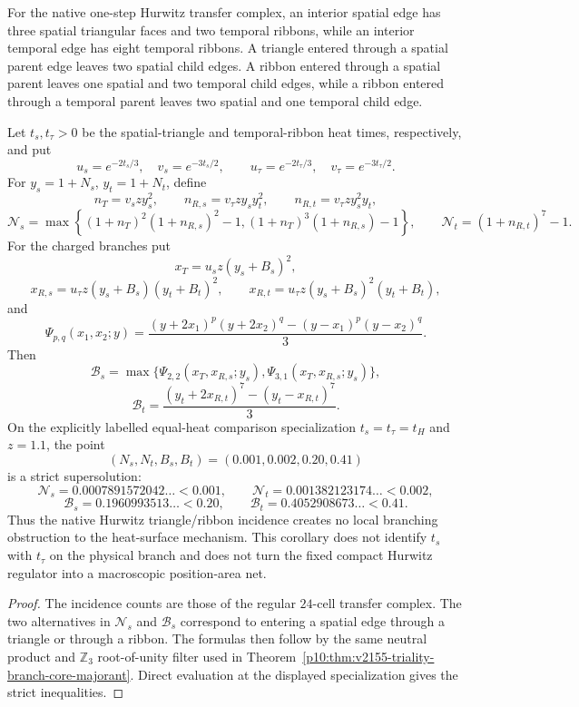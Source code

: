 \documentclass[12pt,a4paper]{article}
\begin{document}
\begin{corollary}
\label{p10:cor:v2158-hurwitz-two-type-triality}
For the native one-step Hurwitz transfer complex, an interior spatial edge has
three spatial triangular faces and two temporal ribbons, while an interior
temporal edge has eight temporal ribbons.  A triangle entered through a
spatial parent edge leaves two spatial child edges.  A ribbon entered through
a spatial parent leaves one spatial and two temporal child edges, while a
ribbon entered through a temporal parent leaves two spatial and one temporal
child edge.

Let $t_s,t_\tau>0$ be the spatial-triangle and temporal-ribbon heat times,
respectively, and put
\[
 u_s=e^{-2t_s/3},\quad v_s=e^{-3t_s/2},\qquad
 u_\tau=e^{-2t_\tau/3},\quad v_\tau=e^{-3t_\tau/2}.
\]
For $y_s=1+N_s$, $y_t=1+N_t$, define
\[
 n_T=v_szy_s^2,\qquad
 n_{R,s}=v_\tau z y_s y_t^2,\qquad
 n_{R,t}=v_\tau z y_s^2y_t,
\]
\[
 \mathcal N_s=
 \max\!\left\{
 (1+n_T)^2(1+n_{R,s})^2-1,
 (1+n_T)^3(1+n_{R,s})-1
 \right\},
 \qquad
 \mathcal N_t=(1+n_{R,t})^7-1.
\]
For the charged branches put
\[
 x_T=u_s z(y_s+B_s)^2,
\]
\[
 x_{R,s}=u_\tau z(y_s+B_s)(y_t+B_t)^2,
 \qquad
 x_{R,t}=u_\tau z(y_s+B_s)^2(y_t+B_t),
\]
and
\[
 \Psi_{p,q}(x_1,x_2;y)
 =\frac{(y+2x_1)^p(y+2x_2)^q-(y-x_1)^p(y-x_2)^q}{3}.
\]
Then
\[
 \mathcal B_s=\max\{\Psi_{2,2}(x_T,x_{R,s};y_s),
                       \Psi_{3,1}(x_T,x_{R,s};y_s)\},
\]
\[
 \mathcal B_t=
 \frac{(y_t+2x_{R,t})^7-(y_t-x_{R,t})^7}{3}.
\]
On the explicitly labelled equal-heat comparison specialization
$t_s=t_\tau=t_H$ and $z=1.1$, the point
\[
 (N_s,N_t,B_s,B_t)=(0.001,0.002,0.20,0.41)
\]
is a strict supersolution:
\[
 \mathcal N_s=0.0007891572042\ldots<0.001,
 \qquad
 \mathcal N_t=0.001382123174\ldots<0.002,
\]
\[
 \mathcal B_s=0.1960993513\ldots<0.20,
 \qquad
 \mathcal B_t=0.4052908673\ldots<0.41.
\]
Thus the native Hurwitz triangle/ribbon incidence creates no local branching
obstruction to the heat-surface mechanism.  This corollary does not identify
$t_s$ with $t_\tau$ on the physical branch and does not turn the fixed compact
Hurwitz regulator into a macroscopic position-area net.
\end{corollary}
\begin{proof}
The incidence counts are those of the regular $24$-cell transfer complex.
The two alternatives in $\mathcal N_s$ and $\mathcal B_s$ correspond to
entering a spatial edge through a triangle or through a ribbon.  The formulas
then follow by the same neutral product and $\mathbb Z_3$ root-of-unity filter
used in Theorem~\ref{p10:thm:v2155-triality-branch-core-majorant}.  Direct
evaluation at the displayed specialization gives the strict inequalities.
\end{proof}
\end{document}
